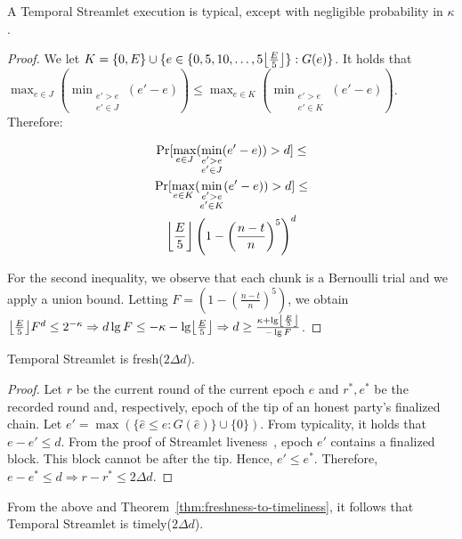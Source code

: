 \begin{lemma} \label{lem:honest-quintuple}
  A Temporal Streamlet execution is typical, except with negligible probability in $\kappa$.
\end{lemma}
\begin{proof}
  We let $K = \{0, E\} \cup \{e \in \{0, 5, 10 ,\ldots, 5\floor*{\frac{E}{5}}\}: G(e)\}$.
  It holds that
  $\max_{e \in J}(\min_{\substack{e' > e \\ e' \in J}}(e' - e)) \leq \max_{e \in K}(\min_{\substack{e' > e \\ e' \in K}}(e' - e))$.
  Therefore:

  \begin{gather*}
      \Pr [\max_{e \in J}(\min_{\substack{e' > e \\ e' \in J}}(e' - e)) > d] \leq \\
      \Pr [\max_{e \in K}(\min_{\substack{e' > e \\ e' \in K}}(e' - e)) > d] \leq \\
      \floor*{\frac{E}{5}} \left(1 - \left(\frac{n - t}{n}\right)^5\right)^d
  \end{gather*}

  For the second inequality, we observe that each chunk is a Bernoulli trial and we
  apply a union bound.
  Letting $F = \left(1 - \left(\frac{n - t}{n}\right)^5\right)$, we obtain
  $\floor*{\frac{E}{5}} F^d \leq 2^{-\kappa} \Rightarrow
   d \lg F \leq -\kappa - \lg \floor*{\frac{E}{5}} \Rightarrow
   d \geq \frac{\kappa + \lg \floor*{\frac{E}{5}}}{- \lg F}
  $.
  \Qed
\end{proof}

\begin{theorem} \label{thm:latest-finalized-round}
  Temporal Streamlet is fresh($2\Delta d$).
\end{theorem}
\begin{proof}
  Let $r$ be the current round of the current epoch $e$
  and $r^*,e^*$ be the recorded round and, respectively, epoch of the tip
  of an honest party's finalized chain.
  Let $e' = \max(\{\hat e \leq e: G(\hat e)\} \cup \{0\})$.
  From typicality, it holds that $e - e' \leq d$.
  From the proof of Streamlet liveness~\cite[Theorem 6]{streamlet}, epoch $e'$ contains a finalized
  block. This block cannot be after the tip.
  Hence, $e' \leq e^*$. Therefore, $e - e^* \leq d \Rightarrow r - r^* \leq 2\Delta d$.
  \Qed
\end{proof}

From the above and Theorem~\ref{thm:freshness-to-timeliness}, it follows that
Temporal Streamlet is timely($2\Delta d$).
